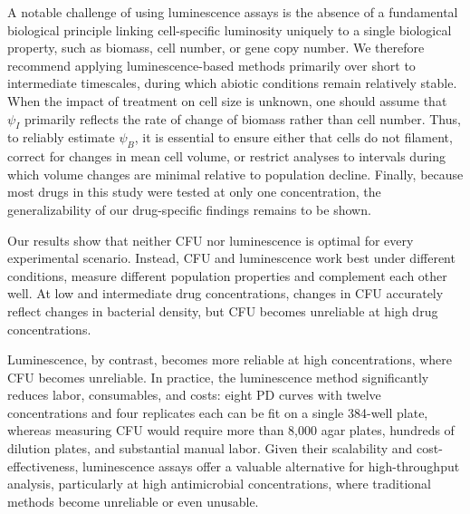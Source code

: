 A notable challenge of using luminescence assays is the absence of a fundamental biological principle linking cell-specific luminosity uniquely to a single biological property, such as biomass, cell number, or gene copy number.
We therefore recommend applying luminescence-based methods primarily over short to intermediate timescales, during which abiotic conditions remain relatively stable.
When the impact of treatment on cell size is unknown, one should assume that \(\psi_I\) primarily reflects the rate of change of biomass rather than cell number.
Thus, to reliably estimate \(\psi_B\), it is essential to ensure either that cells do not filament, correct for changes in mean cell volume, or restrict analyses to intervals during which volume changes are minimal relative to population decline.
Finally, because most drugs in this study were tested at only one concentration, the generalizability of our drug-specific findings remains to be shown.

Our results show that neither CFU nor luminescence is optimal for every experimental scenario.
Instead, CFU and luminescence work best under different conditions, measure different population properties and complement each other well.
At low and intermediate drug concentrations, changes in CFU accurately reflect changes in bacterial density, but CFU becomes unreliable at high drug concentrations.

Luminescence, by contrast, becomes more reliable at high concentrations, where CFU becomes unreliable.
In practice, the luminescence method significantly reduces labor, consumables, and costs: eight PD curves with twelve concentrations and four replicates each can be fit on a single 384-well plate, whereas measuring CFU would require more than 8,000 agar plates, hundreds of dilution plates, and substantial manual labor.
Given their scalability and cost-effectiveness, luminescence assays offer a valuable alternative for high-throughput analysis, particularly at high antimicrobial concentrations, where traditional methods become unreliable or even unusable.

